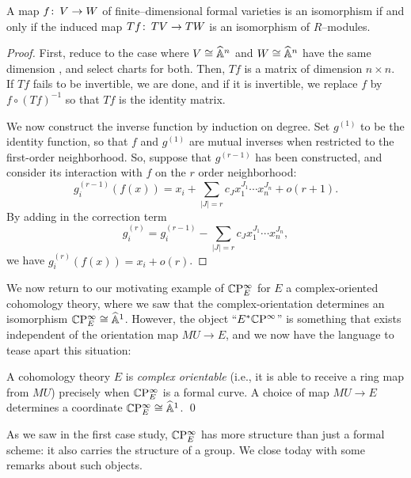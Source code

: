 \begin{theorem}\label{InverseFunctionTheoremForFVars}
A map $f\colon\thinspace V \to W$ of finite--dimensional formal varieties is an isomorphism if and only if the induced map $Tf\colon\thinspace TV \to TW$ is an isomorphism of $R$--modules.
\end{theorem}
\begin{proof}
First, reduce to the case where $V \cong \widehat{\mathbb{A}}^n$ and $W \cong \widehat{\mathbb{A}}^n$ have the same dimension , and select charts for both.  Then, $Tf$ is a matrix of dimension $n \times n$.  If $Tf$ fails to be invertible, we are done, and if it is invertible, we replace $f$ by $f \circ (Tf)^{-1}$ so that $Tf$ is the identity matrix.

We now construct the inverse function by induction on degree.  Set $g^{(1)}$ to be the identity function, so that $f$ and $g^{(1)}$ are mutual inverses when restricted to the first-order neighborhood.  So, suppose that $g^{(r-1)}$ has been constructed, and consider its interaction with $f$ on the $r${\th} order neighborhood: \[g_i^{(r-1)}(f(x)) = x_i + \sum_{|J| = r} c_J x_1^{J_1} \cdots x_n^{J_n} + o(r+1). \]  By adding in the correction term \[g_i^{(r)} = g_i^{(r-1)} - \sum_{|J| = r} c_J x_1^{J_1} \cdots x_n^{J_n},\] we have $g_i^{(r)}(f(x)) = x_i + o(r)$.
\end{proof}

We now return to our motivating example of $\mathbb{C}\mathrm P^\infty_E$ for $E$ a complex-oriented cohomology theory, where we saw that the complex-orientation determines an isomorphism $\mathbb{C}\mathrm P^\infty_E \cong \widehat{\mathbb{A}}^1$.  However, the object ``$E^* \mathbb{C}\mathrm P^\infty$'' is something that exists independent of the orientation map $MU \to E$, and we now have the language to tease apart this situation:
\begin{lemma}
A cohomology theory $E$ is \textit{complex orientable} (i.e., it is able to receive a ring map from $MU$) precisely when $\mathbb{C}\mathrm P^\infty_E$ is a formal curve.  A choice of map $MU \to E$ determines a coordinate $\mathbb{C}\mathrm P^\infty_E \cong \widehat{\mathbb{A}}^1$. \qed
\end{lemma}

As we saw in the first case study, $\mathbb{C}\mathrm P^\infty_E$ has more structure than just a formal scheme: it also carries the structure of a group.  We close today with some remarks about such objects.

